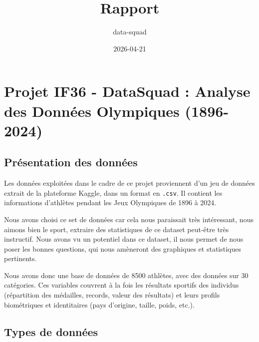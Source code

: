 \documentclass[
]{article}
\title{Rapport}
\author{data-squad}
\date{2026-04-21}
\begin{document}
\maketitle

\section{Projet IF36 - DataSquad : Analyse des Données Olympiques
(1896-2024)}\label{projet-if36---datasquad-analyse-des-donnuxe9es-olympiques-1896-2024}

\subsection{Présentation des
données}\label{pruxe9sentation-des-donnuxe9es}

Les données exploitées dans le cadre de ce projet proviennent d'un jeu
de données extrait de la plateforme Kaggle, dans un format en
\texttt{.csv}. Il contient les informations d'athlètes pendant les Jeux
Olympiques de 1896 à 2024.

Nous avons choisi ce set de données car cela nous paraissait très
intéressant, nous aimons bien le sport, extraire des statistiques de ce
dataset peut-être très instructif. Nous avons vu un potentiel dans ce
dataset, il nous permet de nous poser les bonnes questions, qui nous
amèneront des graphiques et statistiques pertinents.

Nous avons donc une base de données de 8500 athlètes, avec des données
sur 30 catégories. Ces variables couvrent à la fois les résultats
sportifs des individus (répartition des médailles, records, valeur des
résultats) et leurs profils biométriques et identitaires (pays
d'origine, taille, poids, etc.).

\subsection{Types de données}\label{types-de-donnuxe9es}
\end{document}
